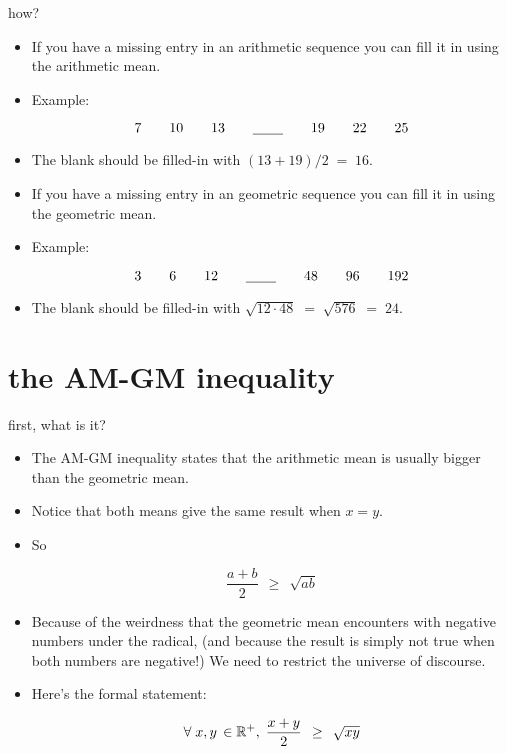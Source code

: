\documentclass[landscape]{beamer}
\begin{document}
\begin{frame}{how?}
\begin{itemize}


\item If you have a missing entry in an arithmetic sequence you can fill it in using the arithmetic mean. \pause

\item Example:

\[ 7 \qquad 10 \qquad 13 \qquad \underline{\hspace{.3in}} \qquad 19 \qquad 22 \qquad 25 \]
\pause

\item The blank should be filled-in with $(13+19)/2 \; = \; 16$. \pause

\item If you have a missing entry in an geometric sequence you can fill it in using the geometric mean. \pause

\item Example:

\[ 3 \qquad 6 \qquad 12 \qquad \underline{\hspace{.3in}} \qquad 48 \qquad 96 \qquad 192 \]

\pause

\item The blank should be filled-in with $\sqrt{12 \cdot 48} \; = \; \sqrt{576} \; = \; 24$. 

\end{itemize}
\end{frame}

\section{the AM-GM inequality}

\begin{frame}{first, what is it?}
\begin{itemize}
\item The AM-GM inequality states that the arithmetic mean is usually bigger than the geometric mean.\pause
\item Notice that both means give the same result when $x=y$. \pause
\item So

\[ \frac{a+b}{2} \; \, \geq \, \; \sqrt{ab} \]

\pause 

\item Because of the weirdness that the geometric mean encounters with negative numbers under the radical, \pause \newline
(and because the result is simply not true when both numbers are negative!) \pause \newline
We need to restrict the universe of discourse. \pause

\item Here's the formal statement: \pause

\[ \forall\; x, y \, \in {\mathbb R}^+, \; \frac{x+y}{2} \; \, \geq \, \; \sqrt{xy} \]

\end{itemize}
\end{frame}
\end{document}
